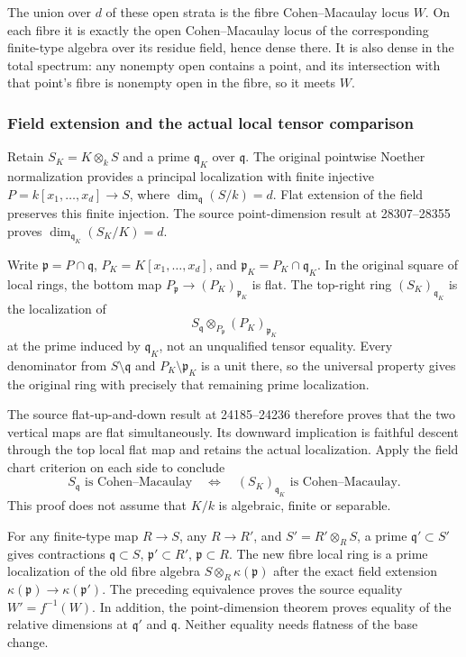 The union over \(d\) of these open strata is the fibre Cohen--Macaulay locus \(W\). On each fibre it is exactly the open Cohen--Macaulay locus of the corresponding finite-type algebra over its residue field, hence dense there. It is also dense in the total spectrum: any nonempty open contains a point, and its intersection with that point's fibre is nonempty open in the fibre, so it meets \(W\).

\subsubsection{Field extension and the actual local tensor comparison}\label{algebra-proof-040-field-extension-and-the-actual-local-tensor-comparison}

Retain \(S_K=K\otimes_k S\) and a prime \(\mathfrak q_K\) over \(\mathfrak q\). The original pointwise Noether normalization provides a principal localization with finite injective \(P=k[x_1,\ldots,x_d]\to S\), where \(\dim_{\mathfrak q}(S/k)=d\). Flat extension of the field preserves this finite injection. The source point-dimension result at 28307--28355 proves \(\dim_{\mathfrak q_K}(S_K/K)=d\).

Write \(\mathfrak p=P\cap\mathfrak q\), \(P_K=K[x_1,\ldots,x_d]\), and \(\mathfrak p_K=P_K\cap\mathfrak q_K\). In the original square of local rings, the bottom map \(P_{\mathfrak p}\to(P_K)_{\mathfrak p_K}\) is flat. The top-right ring \((S_K)_{\mathfrak q_K}\) is the localization of \[
S_{\mathfrak q}\otimes_{P_{\mathfrak p}}(P_K)_{\mathfrak p_K}
\] at the prime induced by \(\mathfrak q_K\), not an unqualified tensor equality. Every denominator from \(S\setminus\mathfrak q\) and \(P_K\setminus\mathfrak p_K\) is a unit there, so the universal property gives the original ring with precisely that remaining prime localization.

The source flat-up-and-down result at 24185--24236 therefore proves that the two vertical maps are flat simultaneously. Its downward implication is faithful descent through the top local flat map and retains the actual localization. Apply the field chart criterion on each side to conclude \[
S_{\mathfrak q}\text{ is Cohen–Macaulay}
\quad\Longleftrightarrow\quad
(S_K)_{\mathfrak q_K}\text{ is Cohen–Macaulay}.
\] This proof does not assume that \(K/k\) is algebraic, finite or separable.

For any finite-type map \(R\to S\), any \(R\to R'\), and \(S'=R'\otimes_R S\), a prime \(\mathfrak q'\subset S'\) gives contractions \(\mathfrak q\subset S\), \(\mathfrak p'\subset R'\), \(\mathfrak p\subset R\). The new fibre local ring is a prime localization of the old fibre algebra \(S\otimes_R\kappa(\mathfrak p)\) after the exact field extension \(\kappa(\mathfrak p)\to\kappa(\mathfrak p')\). The preceding equivalence proves the source equality \(W'=f^{-1}(W)\). In addition, the point-dimension theorem proves equality of the relative dimensions at \(\mathfrak q'\) and \(\mathfrak q\). Neither equality needs flatness of the base change.

